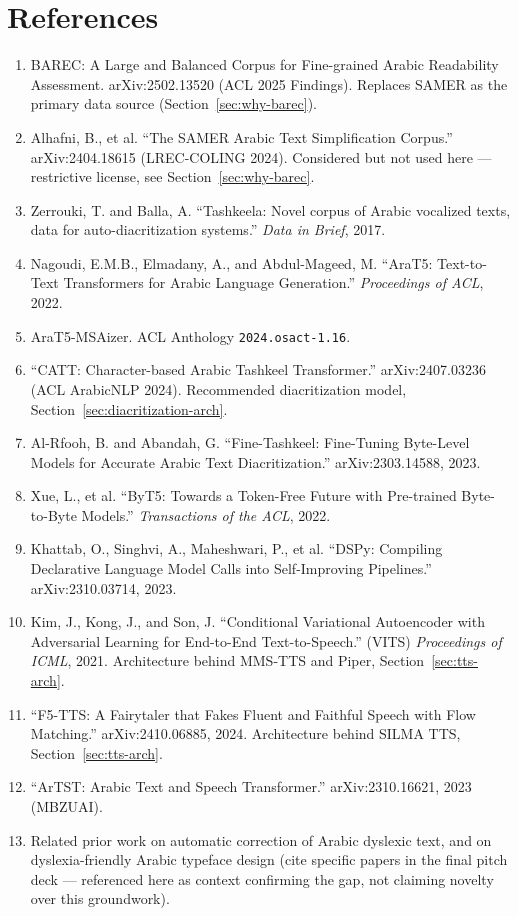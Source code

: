 \documentclass[11pt,a4paper]{article}
\begin{document}
\newpage
\section*{References}
\begin{enumerate}[leftmargin=1.6em]
\item BAREC: A Large and Balanced Corpus for Fine-grained Arabic Readability
Assessment. arXiv:2502.13520 (ACL 2025 Findings). Replaces SAMER as the
primary data source (Section~\ref{sec:why-barec}).
\item Alhafni, B., et al. ``The SAMER Arabic Text Simplification Corpus.''
arXiv:2404.18615 (LREC-COLING 2024). Considered but not used here --- restrictive
license, see Section~\ref{sec:why-barec}.
\item Zerrouki, T. and Balla, A. ``Tashkeela: Novel corpus of Arabic vocalized
texts, data for auto-diacritization systems.'' \emph{Data in Brief}, 2017.
\item Nagoudi, E.M.B., Elmadany, A., and Abdul-Mageed, M. ``AraT5: Text-to-Text
Transformers for Arabic Language Generation.'' \emph{Proceedings of ACL}, 2022.
\item AraT5-MSAizer. ACL Anthology \texttt{2024.osact-1.16}.
\item ``CATT: Character-based Arabic Tashkeel Transformer.'' arXiv:2407.03236
(ACL ArabicNLP 2024). Recommended diacritization model, Section~\ref{sec:diacritization-arch}.
\item Al-Rfooh, B. and Abandah, G. ``Fine-Tashkeel: Fine-Tuning Byte-Level
Models for Accurate Arabic Text Diacritization.'' arXiv:2303.14588, 2023.
\item Xue, L., et al. ``ByT5: Towards a Token-Free Future with Pre-trained
Byte-to-Byte Models.'' \emph{Transactions of the ACL}, 2022.
\item Khattab, O., Singhvi, A., Maheshwari, P., et al. ``DSPy: Compiling
Declarative Language Model Calls into Self-Improving Pipelines.''
arXiv:2310.03714, 2023.
\item Kim, J., Kong, J., and Son, J. ``Conditional Variational Autoencoder
with Adversarial Learning for End-to-End Text-to-Speech.'' (VITS)
\emph{Proceedings of ICML}, 2021. Architecture behind MMS-TTS and Piper,
Section~\ref{sec:tts-arch}.
\item ``F5-TTS: A Fairytaler that Fakes Fluent and Faithful Speech with Flow
Matching.'' arXiv:2410.06885, 2024. Architecture behind SILMA TTS,
Section~\ref{sec:tts-arch}.
\item ``ArTST: Arabic Text and Speech Transformer.'' arXiv:2310.16621, 2023
(MBZUAI).
\item Related prior work on automatic correction of Arabic dyslexic text, and on
dyslexia-friendly Arabic typeface design (cite specific papers in the final pitch
deck --- referenced here as context confirming the gap, not claiming novelty over
this groundwork).
\end{enumerate}
\end{document}
